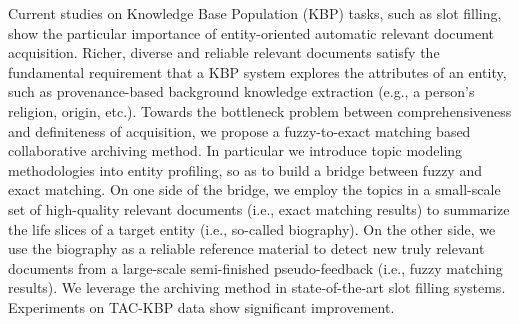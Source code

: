 Current studies on Knowledge Base Population (KBP) tasks, such as slot filling, show the particular importance of entity-oriented automatic relevant document acquisition. Richer, diverse and reliable relevant documents satisfy the fundamental requirement that a KBP system explores the attributes of an entity, such as provenance-based background knowledge extraction (e.g., a person's religion, origin,  etc.). Towards the bottleneck problem between comprehensiveness and definiteness of acquisition, we propose a fuzzy-to-exact matching based collaborative archiving method. In particular we introduce topic modeling methodologies into entity profiling, so as to build a bridge between fuzzy and exact matching. On one side of the bridge, we employ the topics in a small-scale set of high-quality relevant documents (i.e., exact matching results) to summarize the life slices of a target entity (i.e., so-called biography).  On the other side, we use the biography as a reliable reference material to detect new truly relevant documents from a large-scale semi-finished pseudo-feedback (i.e., fuzzy matching results). We leverage the archiving method in state-of-the-art slot filling systems. Experiments on TAC-KBP data show significant improvement.
